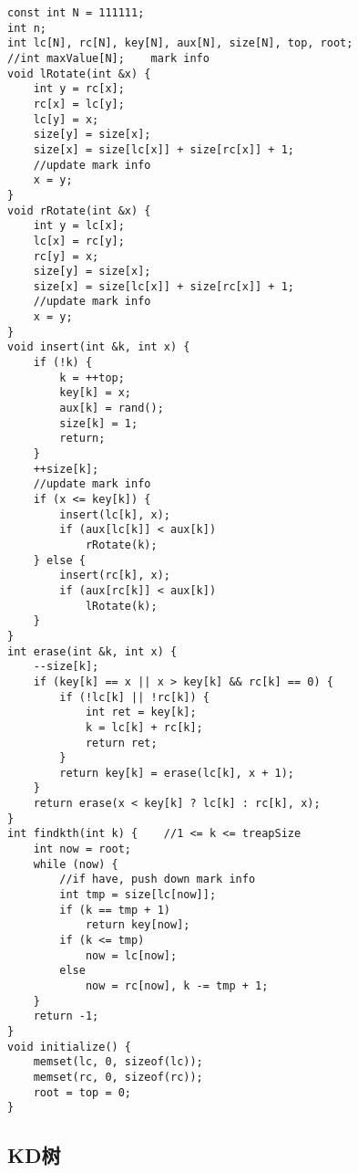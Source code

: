 \documentclass{article}
\begin{document}
\begin{lstlisting}
const int N = 111111;
int n;
int lc[N], rc[N], key[N], aux[N], size[N], top, root;
//int maxValue[N];    mark info
void lRotate(int &x) {
    int y = rc[x];
    rc[x] = lc[y];
    lc[y] = x;
    size[y] = size[x];
    size[x] = size[lc[x]] + size[rc[x]] + 1;
    //update mark info
    x = y;
}
void rRotate(int &x) {
    int y = lc[x];
    lc[x] = rc[y];
    rc[y] = x;
    size[y] = size[x];
    size[x] = size[lc[x]] + size[rc[x]] + 1;
    //update mark info
    x = y;
}
void insert(int &k, int x) {
    if (!k) {
        k = ++top;
        key[k] = x;
        aux[k] = rand();
        size[k] = 1;
        return;
    }
    ++size[k];
    //update mark info
    if (x <= key[k]) {
        insert(lc[k], x);
        if (aux[lc[k]] < aux[k])
            rRotate(k);
    } else {
        insert(rc[k], x);
        if (aux[rc[k]] < aux[k])
            lRotate(k);
    }
}
int erase(int &k, int x) {
    --size[k];
    if (key[k] == x || x > key[k] && rc[k] == 0) {
        if (!lc[k] || !rc[k]) {
            int ret = key[k];
            k = lc[k] + rc[k];
            return ret;
        }
        return key[k] = erase(lc[k], x + 1);
    }
    return erase(x < key[k] ? lc[k] : rc[k], x);
}
int findkth(int k) {    //1 <= k <= treapSize
    int now = root;
    while (now) {
        //if have, push down mark info
        int tmp = size[lc[now]];
        if (k == tmp + 1)
            return key[now];
        if (k <= tmp)
            now = lc[now];
        else
            now = rc[now], k -= tmp + 1;
    }
    return -1;
}
void initialize() {
    memset(lc, 0, sizeof(lc));
    memset(rc, 0, sizeof(rc));
    root = top = 0;
}
\end{lstlisting}

\subsection{KD树}
\end{document}
